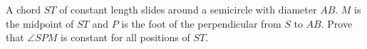 A chord $ST$ of constant length slides around a semicircle with diameter $AB$. $M$ is the midpoint of $ST$ and $P$ is the foot of the perpendicular from $S$ to $AB$. Prove that $\angle SPM$ is constant for all positions of $ST$.
